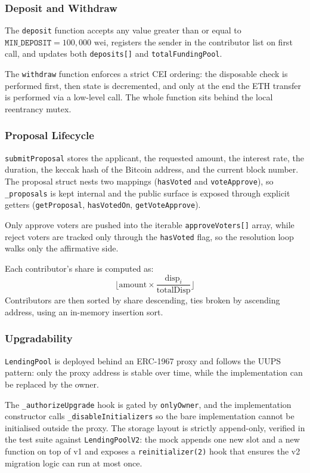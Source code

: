 \documentclass{report}
\begin{document}
\subsubsection*{Deposit and Withdraw}
The \texttt{deposit} function accepts any value greater than or equal to $\texttt{MIN\_DEPOSIT} = 100{,}000 \text{ wei}$, registers the sender in the contributor list on first call, and updates both \texttt{deposits[]} and \texttt{totalFundingPool}. 

The \texttt{withdraw} function enforces a strict CEI ordering: the disposable check is performed first, then state is decremented, and only at the end the ETH transfer is performed via a low-level call. The whole function sits behind the local reentrancy mutex.

\subsubsection*{Proposal Lifecycle}
\texttt{submitProposal} stores the applicant, the requested amount, the interest rate, the duration, the keccak hash of the Bitcoin address, and the current block number. The proposal struct nests two mappings (\texttt{hasVoted} and \texttt{voteApprove}), so \texttt{\_proposals} is kept internal and the public surface is exposed through explicit getters (\texttt{getProposal}, \texttt{hasVotedOn}, \texttt{getVoteApprove}).

Only approve voters are pushed into the iterable \texttt{approveVoters[]} array, while reject voters are tracked only through the \texttt{hasVoted} flag, so the resolution loop walks only the affirmative side.

Each contributor's share is computed as:
$$\lfloor \text{amount} \times \frac{\text{disp}_i}{\text{totalDisp}} \rfloor$$
Contributors are then sorted by share descending, ties broken by ascending address, using an in-memory insertion sort.

\subsubsection*{Upgradability}
\texttt{LendingPool} is deployed behind an ERC-1967 proxy and follows the UUPS pattern: only the proxy address is stable over time, while the implementation can be replaced by the owner. 

The \texttt{\_authorizeUpgrade} hook is gated by \texttt{onlyOwner}, and the implementation constructor calls \texttt{\_disableInitializers} so the bare implementation cannot be initialised outside the proxy. The storage layout is strictly append-only, verified in the test suite against \texttt{LendingPoolV2}: the mock appends one new slot and a new function on top of v1 and exposes a \texttt{reinitializer(2)} hook that ensures the v2 migration logic can run at most once.
\end{document}
